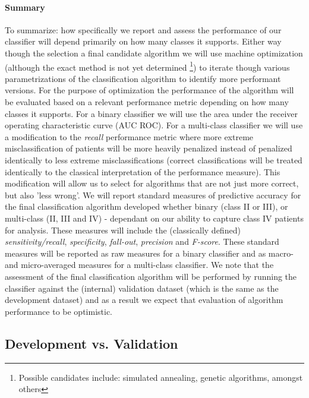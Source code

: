 \documentclass[]{article}
\begin{document}
\paragraph{Summary}

To summarize: how specifically we report and assess the performance of our classifier will depend primarily on how many classes it supports. Either way though the selection a final candidate algorithm we will use machine optimization (although the exact method is not yet determined \footnote{Possible candidates include: simulated annealing, genetic algorithms, amongst others\cite{Segaran2007}}) to iterate though various parametrizations of the classification algorithm to identify more performant versions. For the purpose of optimization the performance of the algorithm will be evaluated based on a relevant performance metric depending on how many classes it supports. For a binary classifier we will use the area under the receiver operating characteristic curve (AUC ROC). For a multi-class classifier we will use a modification to the \textit{recall} performance metric where more extreme misclassification of patients will be more heavily penalized instead of penalized identically to less extreme misclassifications (correct classifications will be treated identically to the classical interpretation of the performance measure). This modification will allow us to select for algorithms that are not just more correct, but also 'less wrong'. We will report standard measures of predictive accuracy for the final classification algorithm developed whether binary (class II or III), or multi-class (II, III and IV) - dependant on our ability to capture class IV patients for analysis. These measures will include the (classically defined) \textit{sensitivity/recall}, \textit{specificity}, \textit{fall-out}, \textit{precision} and \textit{F-score}. These standard measures will be reported as raw measures for a binary classifier and as macro- and micro-averaged measures for a multi-class classifier. We note that the assessment of the final classification algorithm will be performed by running the classifier against the (internal) validation dataset (which is the same as the development dataset) and as a result we expect that evaluation of algorithm performance to be optimistic. 

\subsection{Development vs. Validation} %
\end{document}
